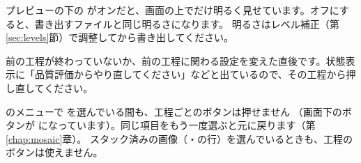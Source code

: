 プレビューの下の  がオンだと、画面の上でだけ明るく見せています。オフにすると、書き出すファイルと同じ明るさになります。
明るさはレベル補正（第\ref{sec:levels}節）で調整してから書き出してください。

前の工程が終わっていないか、前の工程に関わる設定を変えた直後です。状態表示に「品質評価からやり直してください」などと出ているので、その工程から押し直してください。

 のメニューで  を選んでいる間も、工程ごとのボタンは押せません
（画面下のボタンが  になっています）。同じ項目をもう一度選ぶと元に戻ります（第\ref{chap:mosaic}章）。
スタック済みの画像（・の行）を選んでいるときも、工程のボタンは使えません。
